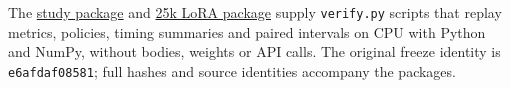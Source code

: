 The \href{https://github.com/LuccaPereiraMartins/decision-models/tree/b5fa6c7ccbfd993805a7b627a0e4ca2ae3424445/decision_models/reports/binary-v2}{study package} and \href{https://github.com/LuccaPereiraMartins/decision-models/tree/7319fe681a121ec990ec924ec7f757237d26db93/decision_models/reports/lora25k}{25k LoRA package} supply \texttt{verify.py} scripts that replay metrics, policies, timing summaries and paired intervals on CPU with Python and NumPy, without bodies, weights or API calls. The original freeze identity is \texttt{e6afdaf08581}; full hashes and source identities accompany the packages.
